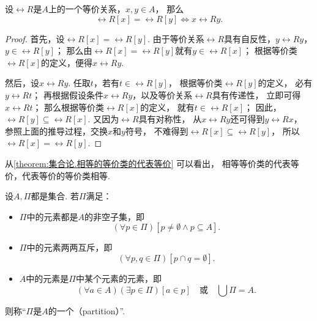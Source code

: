\begin{lemma}\label{theorem:集合论.相等的等价类的代表等价}
设\(\rel{R}\)是\(A\)上的一个等价关系，\(x,y \in A\)，
那么\begin{equation*}
	\rel{R}[x] = \rel{R}[y]
	\iff
	x \rel{R} y.
\end{equation*}
\begin{proof}
首先，设\(\rel{R}[x] = \rel{R}[y]\).
由于等价关系\(\rel{R}\)具有自反性，\(y \rel{R} y\)，\(y \in \rel{R}[y]\)；
那么由\(\rel{R}[x] = \rel{R}[y]\)就有\(y \in \rel{R}[x]\)；
根据等价类\(\rel{R}[x]\)的定义，便得\(x \rel{R} y\).

然后，设\(x \rel{R} y\).
任取\(t\)，若有\(t \in \rel{R}[y]\)，
根据等价类\(\rel{R}[y]\)的定义，
必有\(y \rel{R} t\)；
再根据假设条件\(x \rel{R} y\)，以及等价关系\(\rel{R}\)具有传递性，
立即可得\(x \rel{R} t\)；
那么根据等价类\(\rel{R}[x]\)的定义，
就有\(t \in \rel{R}[x]\)；
因此，\(\rel{R}[y] \subseteq \rel{R}[x]\).
又因为\(\rel{R}\)具有对称性，
从\(x \rel{R} y\)还可得到\(y \rel{R} x\)，
参照上面的推导过程，交换\(x\)和\(y\)符号，
不难得到\(\rel{R}[x] \subseteq \rel{R}[y]\)，
所以\(\rel{R}[x] = \rel{R}[y]\).
\end{proof}
\end{lemma}
从\cref{theorem:集合论.相等的等价类的代表等价} 可以看出，
相等等价类的代表等价，代表等价的等价类相等.

\begin{definition}\label{definition:集合论.划分的定义}
设\(A,\Pi\)都是集合.
若\(\Pi\)满足：
\begin{itemize}
	\item \(\Pi\)中的元素都是\(A\)的非空子集，即\begin{equation*}
		(\forall p \in \Pi)
		[
			p \neq \emptyset
			\land
			p \subseteq A
		].
	\end{equation*}

	\item \(\Pi\)中的元素两两互斥，即\begin{equation*}
		(\forall p,q \in \Pi)[p \cap q = \emptyset].
	\end{equation*}

	\item \(A\)中的元素是\(\Pi\)中某个元素的元素，即\begin{equation*}
		(\forall a \in A)
		(\exists p \in \Pi)
		[a \in p]
		\quad\text{或}\quad
		\bigcup\Pi = A.
	\end{equation*}
\end{itemize}
则称“\(\Pi\)是\(A\)的一个（partition）”.
\end{definition}

